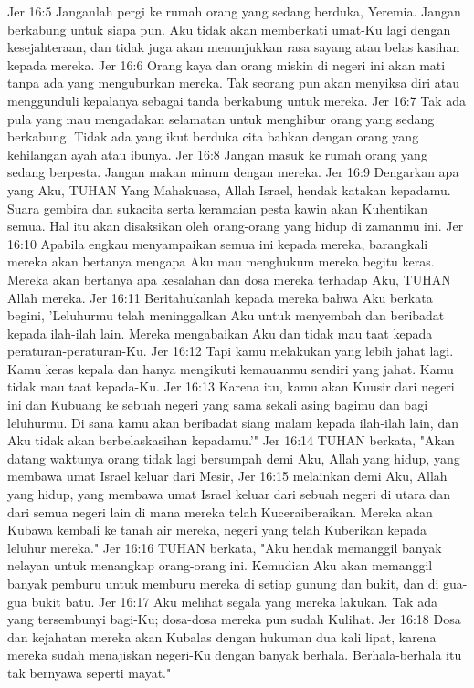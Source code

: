 Jer 16:5  Janganlah pergi ke rumah orang yang sedang berduka, Yeremia. Jangan berkabung untuk siapa pun. Aku tidak akan memberkati umat-Ku lagi dengan kesejahteraan, dan tidak juga akan menunjukkan rasa sayang atau belas kasihan kepada mereka.
Jer 16:6  Orang kaya dan orang miskin di negeri ini akan mati tanpa ada yang menguburkan mereka. Tak seorang pun akan menyiksa diri atau menggunduli kepalanya sebagai tanda berkabung untuk mereka.
Jer 16:7  Tak ada pula yang mau mengadakan selamatan untuk menghibur orang yang sedang berkabung. Tidak ada yang ikut berduka cita bahkan dengan orang yang kehilangan ayah atau ibunya.
Jer 16:8  Jangan masuk ke rumah orang yang sedang berpesta. Jangan makan minum dengan mereka.
Jer 16:9  Dengarkan apa yang Aku, TUHAN Yang Mahakuasa, Allah Israel, hendak katakan kepadamu. Suara gembira dan sukacita serta keramaian pesta kawin akan Kuhentikan semua. Hal itu akan disaksikan oleh orang-orang yang hidup di zamanmu ini.
Jer 16:10  Apabila engkau menyampaikan semua ini kepada mereka, barangkali mereka akan bertanya mengapa Aku mau menghukum mereka begitu keras. Mereka akan bertanya apa kesalahan dan dosa mereka terhadap Aku, TUHAN Allah mereka.
Jer 16:11  Beritahukanlah kepada mereka bahwa Aku berkata begini, 'Leluhurmu telah meninggalkan Aku untuk menyembah dan beribadat kepada ilah-ilah lain. Mereka mengabaikan Aku dan tidak mau taat kepada peraturan-peraturan-Ku.
Jer 16:12  Tapi kamu melakukan yang lebih jahat lagi. Kamu keras kepala dan hanya mengikuti kemauanmu sendiri yang jahat. Kamu tidak mau taat kepada-Ku.
Jer 16:13  Karena itu, kamu akan Kuusir dari negeri ini dan Kubuang ke sebuah negeri yang sama sekali asing bagimu dan bagi leluhurmu. Di sana kamu akan beribadat siang malam kepada ilah-ilah lain, dan Aku tidak akan berbelaskasihan kepadamu.'"
Jer 16:14  TUHAN berkata, "Akan datang waktunya orang tidak lagi bersumpah demi Aku, Allah yang hidup, yang membawa umat Israel keluar dari Mesir,
Jer 16:15  melainkan demi Aku, Allah yang hidup, yang membawa umat Israel keluar dari sebuah negeri di utara dan dari semua negeri lain di mana mereka telah Kuceraiberaikan. Mereka akan Kubawa kembali ke tanah air mereka, negeri yang telah Kuberikan kepada leluhur mereka."
Jer 16:16  TUHAN berkata, "Aku hendak memanggil banyak nelayan untuk menangkap orang-orang ini. Kemudian Aku akan memanggil banyak pemburu untuk memburu mereka di setiap gunung dan bukit, dan di gua-gua bukit batu.
Jer 16:17  Aku melihat segala yang mereka lakukan. Tak ada yang tersembunyi bagi-Ku; dosa-dosa mereka pun sudah Kulihat.
Jer 16:18  Dosa dan kejahatan mereka akan Kubalas dengan hukuman dua kali lipat, karena mereka sudah menajiskan negeri-Ku dengan banyak berhala. Berhala-berhala itu tak bernyawa seperti mayat."
